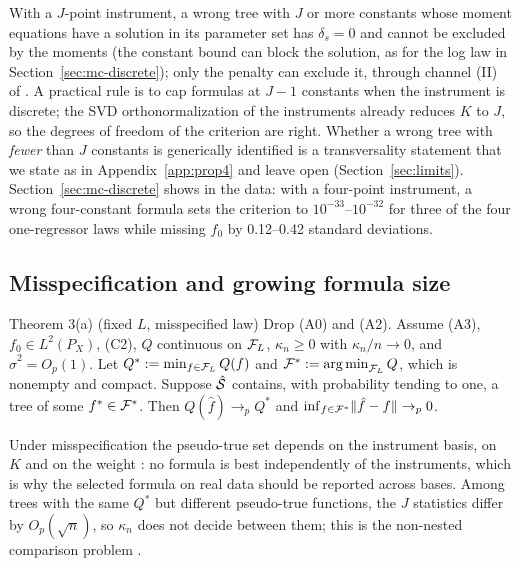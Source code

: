 With a $J$-point instrument, a wrong tree with $J$ or more constants whose moment equations have a solution in its parameter set has $\delta_s = 0$ and cannot be excluded by the moments (the constant bound can block the solution, as for the log law in Section~\ref{sec:mc-discrete}); only the penalty can exclude it, through channel (II) of . A practical rule is to cap formulas at $J - 1$ constants when the instrument is discrete; the SVD orthonormalization of the instruments already reduces $K$ to $J$, so the degrees of freedom of the criterion are right. Whether a wrong tree with \emph{fewer} than $J$ constants is generically identified is a transversality statement that we state as  in Appendix~\ref{app:prop4} and leave open (Section~\ref{sec:limits}). Section~\ref{sec:mc-discrete} shows  in the data: with a four-point instrument, a wrong four-constant formula sets the criterion to $10^{-33}$--$10^{-32}$ for three of the four one-regressor laws while missing $f_0$ by 0.12--0.42 standard deviations.

\subsection{Misspecification and growing formula size}
\label{sec:thm3}

\begin{result}[Theorem3(a)]{Theorem 3(a) (fixed $L$, misspecified law)}\label{res:Theorem3}
Drop (A0) and (A2). Assume (A3), $f_0 \in L^2(P_X)$, (C2), $Q$ continuous on $\mathcal{F}_L$, $\kappa_n \ge 0$ with $\kappa_n/n \to 0$, and $\hat\sigma^2 = O_p(1)$. Let $Q^* := \min_{f \in \mathcal{F}_L}Q(f)$ and $\mathcal{F}^* := \operatorname*{arg\,min}_{\mathcal{F}_L}Q$, which is nonempty and compact. Suppose $\hat{\mathcal{S}}$ contains, with probability tending to one, a tree of some $f^* \in \mathcal{F}^*$. Then $Q(\hat f) \to_p Q^*$ and $\inf_{f \in \mathcal{F}^*}\lVert \hat f - f\rVert \to_p 0$.
\end{result}

Under misspecification the pseudo-true set depends on the instrument basis, on $K$ and on the weight \citep{hallinoue2003}: no formula is best independently of the instruments, which is why the selected formula on real data should be reported across bases. Among trees with the same $Q^*$ but different pseudo-true functions, the $J$ statistics differ by $O_p(\sqrt n)$, so $\kappa_n$ does not decide between them; this is the non-nested comparison problem \citep{vuong1989}.

